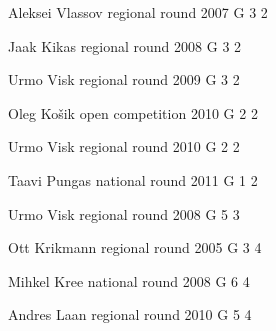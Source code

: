 \documentclass[11pt]{article}
\begin{document}
\ylDisplay{} %
{Aleksei Vlassov} %
{regional round} %
{2007} %
{G 3} %
{2} %
{

\ifEngSolution
\fi
}

\ylDisplay{} %
{Jaak Kikas} %
{regional round} %
{2008} %
{G 3} %
{2} %
{

\ifEngSolution
\fi
}

\ylDisplay{} %
{Urmo Visk} %
{regional round} %
{2009} %
{G 3} %
{2} %
{

\ifEngSolution
\fi
}

\ylDisplay{} %
{Oleg Košik} %
{open competition} %
{2010} %
{G 2} %
{2} %
{

\ifEngSolution
\fi
}

\ylDisplay{} %
{Urmo Visk} %
{regional round} %
{2010} %
{G 2} %
{2} %
{

\ifEngSolution
\fi
}

\ylDisplay{} %
{Taavi Pungas} %
{national round} %
{2011} %
{G 1} %
{2} %
{

\ifEngSolution
\fi
}

\ylDisplay{} %
{Urmo Visk} %
{regional round} %
{2008} %
{G 5} %
{3} %
{

\ifEngSolution
\fi
}

\ylDisplay{} %
{Ott Krikmann} %
{regional round} %
{2005} %
{G 3} %
{4} %
{

\ifEngSolution
\fi
}

\ylDisplay{} %
{Mihkel Kree} %
{national round} %
{2008} %
{G 6} %
{4} %
{

\ifEngSolution
\fi
}

\ylDisplay{} %
{Andres Laan} %
{regional round} %
{2010} %
{G 5} %
{4} %
{

\ifEngSolution
\fi
}
\end{document}
